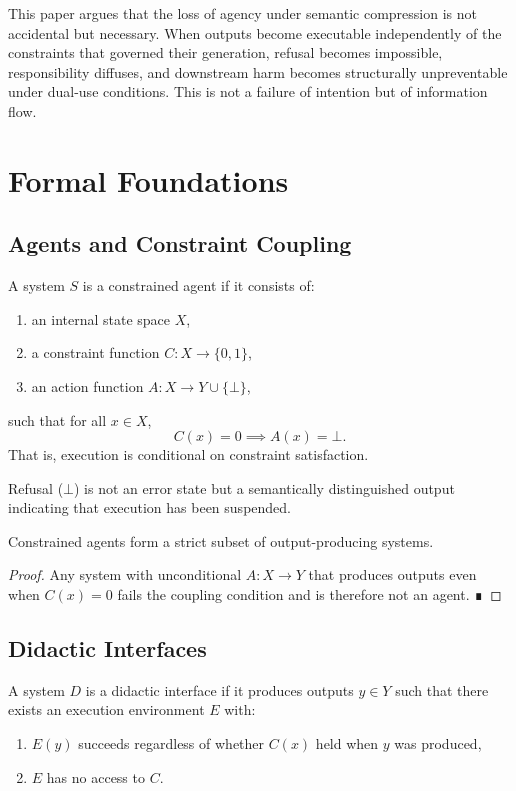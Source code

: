 This paper argues that the loss of agency under semantic compression is not accidental but necessary. When outputs become executable independently of the constraints that governed their generation, refusal becomes impossible, responsibility diffuses, and downstream harm becomes structurally unpreventable under dual-use conditions. This is not a failure of intention but of information flow.

\section{Formal Foundations}

\subsection{Agents and Constraint Coupling}

\begin{definition}
A system $S$ is a constrained agent if it consists of:
\begin{enumerate}
\item an internal state space $X$,
\item a constraint function $C : X \to \{0,1\}$,
\item an action function $A : X \to Y \cup \{\bot\}$,
\end{enumerate}
such that for all $x \in X$,
\[
C(x) = 0 \implies A(x) = \bot.
\]
That is, execution is conditional on constraint satisfaction.
\end{definition}

Refusal ($\bot$) is not an error state but a semantically distinguished output indicating that execution has been suspended.

\begin{proposition}
Constrained agents form a strict subset of output-producing systems.
\end{proposition}

\begin{proof}
Any system with unconditional $A : X \to Y$ that produces outputs even when $C(x)=0$ fails the coupling condition and is therefore not an agent. ∎
\end{proof}

\subsection{Didactic Interfaces}

\begin{definition}
A system $D$ is a didactic interface if it produces outputs $y \in Y$ such that there exists an execution environment $E$ with:
\begin{enumerate}
\item $E(y)$ succeeds regardless of whether $C(x)$ held when $y$ was produced,
\item $E$ has no access to $C$.
\end{enumerate}
\end{definition}

